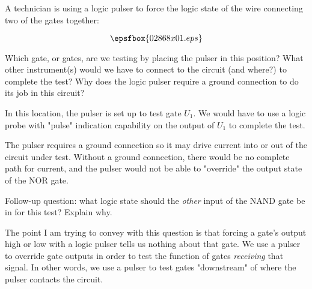 

A technician is using a logic pulser to force the logic state of the wire connecting two of the gates together:

$$\epsfbox{02868x01.eps}$$

Which gate, or gates, are we testing by placing the pulser in this position?  What other instrument(s) would we have to connect to the circuit (and where?) to complete the test?  Why does the logic pulser require a ground connection to do its job in this circuit?







In this location, the pulser is set up to test gate $U_1$.  We would have to use a logic probe with "pulse" indication capability on the output of $U_1$ to complete the test.

The pulser requires a ground connection so it may drive current into or out of the circuit under test.  Without a ground connection, there would be no complete path for current, and the pulser would not be able to "override" the output state of the NOR gate.

\vskip 10pt

Follow-up question: what logic state should the {\it other} input of the NAND gate be in for this test?  Explain why.







The point I am trying to convey with this question is that forcing a gate's output high or low with a logic pulser tells us nothing about that gate.  We use a pulser to override gate outputs in order to test the function of gates {\it receiving} that signal.  In other words, we use a pulser to test gates "downstream" of where the pulser contacts the circuit.




